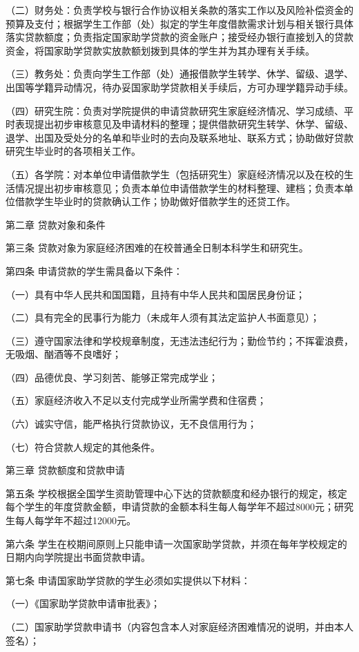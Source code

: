 \documentclass[UTF8,12pt,a4paper]{report}
\begin{document}
（二）财务处：负责学校与银行合作协议相关条款的落实工作以及风险补偿资金的预算及支付；根据学生工作部（处）拟定的学生年度借款需求计划与相关银行具体落实贷款额度；负责指定国家助学贷款的资金账户；接受经办银行直接划入的贷款资金，将国家助学贷款实放款额划拨到具体的学生并为其办理有关手续。

（三）教务处：负责向学生工作部（处）通报借款学生转学、休学、留级、退学、出国等学籍异动情况，待办妥国家助学贷款相关手续后，方可办理学籍异动手续。

（四）研究生院：负责对学院提供的申请贷款研究生家庭经济情况、学习成绩、平时表现提出初步审核意见及申请材料的整理；提供借款研究生转学、休学、留级、退学、出国及受处分的名单和毕业时的去向及联系地址、联系方式；协助做好贷款研究生毕业时的各项相关工作。

（五）各学院：对本单位申请借款学生（包括研究生）家庭经济情况以及在校的生活情况提出初步审核意见；负责本单位申请借款学生的材料整理、建档；负责本单位借款学生毕业时的贷款确认工作；协助做好借款学生的还贷工作。

第二章 贷款对象和条件

第三条 贷款对象为家庭经济困难的在校普通全日制本科学生和研究生。

第四条 申请贷款的学生需具备以下条件：

（一）具有中华人民共和国国籍，且持有中华人民共和国居民身份证；

（二）具有完全的民事行为能力（未成年人须有其法定监护人书面意见）；

（三）遵守国家法律和学校规章制度，无违法违纪行为；勤俭节约；不挥霍浪费，无吸烟、酗酒等不良嗜好；

（四）品德优良、学习刻苦、能够正常完成学业；

（五）家庭经济收入不足以支付完成学业所需学费和住宿费；

（六）诚实守信，能严格执行贷款协议，无不良信用行为；

（七）符合贷款人规定的其他条件。

第三章 贷款额度和贷款申请

第五条 学校根据全国学生资助管理中心下达的贷款额度和经办银行的规定，核定每个学生的年度贷款金额，申请贷款的金额本科生每人每学年不超过8000元；研究生每人每学年不超过12000元。

第六条 学生在校期间原则上只能申请一次国家助学贷款，并须在每年学校规定的日期内向学院提出书面贷款申请。

第七条 申请国家助学贷款的学生必须如实提供以下材料：

（一）《国家助学贷款申请审批表》；

（二）国家助学贷款申请书（内容包含本人对家庭经济困难情况的说明，并由本人签名）；
\end{document}
